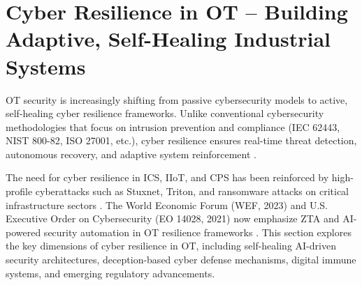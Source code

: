 \section{Cyber Resilience in OT – Building Adaptive, Self-Healing Industrial Systems}
\label{sec:CyberRes}
OT security is increasingly shifting from passive cybersecurity models to active, self-healing cyber resilience frameworks. Unlike conventional cybersecurity methodologies that focus on intrusion prevention and compliance (IEC 62443, NIST 800-82, ISO 27001, etc.), cyber resilience ensures real-time threat detection, autonomous recovery, and adaptive system reinforcement \cite{ross2021nist}.

The need for cyber resilience in ICS, IIoT, and CPS has been reinforced by high-profile cyberattacks such as Stuxnet, Triton, and ransomware attacks on critical infrastructure sectors \cite{derbyshire2024dead}. The World Economic Forum (WEF, 2023) and U.S. Executive Order on Cybersecurity (EO 14028, 2021) now emphasize ZTA and AI-powered security automation in OT resilience frameworks \cite{WEF}. This section explores the key dimensions of cyber resilience in OT, including self-healing AI-driven security architectures, deception-based cyber defense mechanisms, digital immune systems, and emerging regulatory advancements.
